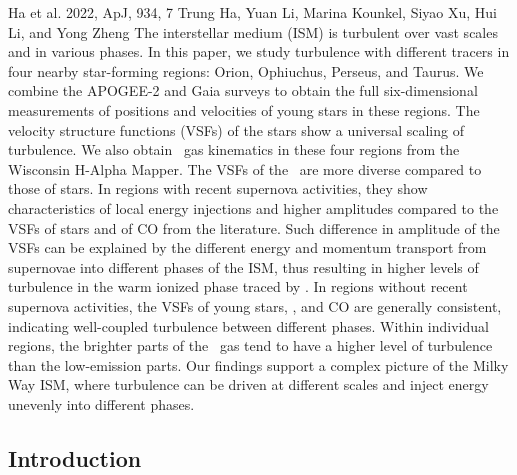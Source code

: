 \publicationdetails
{Ha et al. 2022, ApJ, 934, 7}
{Trung Ha\footnotemark[1], Yuan Li\footnotemark[1], Marina Kounkel\footnotemark[2], Siyao Xu\footnotemark[3]\footnotemark[4], Hui Li\footnotemark[5]\footnotemark[4], and Yong Zheng\footnotemark[6]}
{The interstellar medium (ISM) is turbulent over vast scales and in various phases. In this paper, we study turbulence with different tracers in four nearby star-forming regions: Orion, Ophiuchus, Perseus, and Taurus. We combine the APOGEE-2 and Gaia surveys to obtain the full six-dimensional measurements of positions and velocities of young stars in these regions. The velocity structure functions (VSFs) of the stars show a universal scaling of turbulence. We also obtain \halpha~gas kinematics in these four regions from the Wisconsin H-Alpha Mapper. The VSFs of the \halpha~are more diverse compared to those of stars. In regions with recent supernova activities, they show characteristics of local energy injections and higher amplitudes compared to the VSFs of stars and of CO from the literature. Such difference in amplitude of the VSFs can be explained by the different energy and momentum transport from supernovae into different phases of the ISM, thus resulting in higher levels of turbulence in the warm ionized phase traced by \halpha. In regions without recent supernova activities, the VSFs of young stars, \halpha, and CO are generally consistent, indicating well-coupled turbulence between different phases. Within individual regions, the brighter parts of the \halpha~gas tend to have a higher level of turbulence than the low-emission parts. Our findings support a complex picture of the Milky Way ISM, where turbulence can be driven at different scales and inject energy unevenly into different phases.}
{
}
\setcounter{footnote}{0}

\subsection{Introduction} \label{sec:multi-region-intro}

